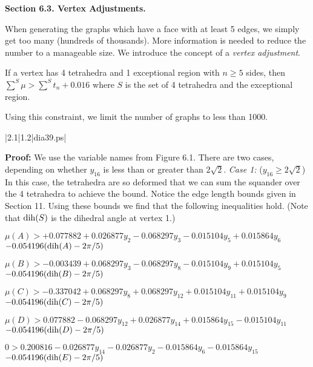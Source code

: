 \bigskip

{\bf Section 6.3. Vertex Adjustments.}

\bigskip


When generating the graphs which have a face with at least 5 edges, we simply get too many (hundreds of thousands).  More information is needed to reduce the number to a manageable size.  We introduce the concept of a {\it vertex adjustment}.  

 If a vertex has 4 tetrahedra and 1 exceptional region with $n\ge5$ sides, then $\sum^S\mu > \sum^S t_n+0.016$ where $S$ is the set of 4 tetrahedra and the exceptional region.
\endproclaim

Using this constraint, we limit the number of graphs to less than 1000.  

\gram|2.1|1.2|dia39.ps|  %


{\bf Proof:} We use the variable names from Figure 6.1. 
There are two cases, depending on whether $y_{16}$ is less than or greater than $2\sqrt 2$.
{\it Case 1:} ($y_{16}\ge2\sqrt2$) In this case, the tetrahedra are so deformed that we can sum the squander over the 4 tetrahedra to achieve the bound.  
Notice the edge length bounds given in Section 11.  Using these bounds we find that the following inequalities hold.  (Note that $\operatorname{dih}(S)$ is the dihedral angle at vertex 1.)



$\mu(A) > + 0.077882  + 0.026877 y_2 - 0.068297 y_3 - 0.015104 y_5 + 0.015864 y_6$  \newline $- 0.054196 (\operatorname{dih}(A)-2 \pi /5) $

$\mu(B) > - 0.003439  + 0.068297 y_3 - 0.068297 y_8 - 0.015104 y_9 + 0.015104 y_5$  \newline $- 0.054196 (\operatorname{dih}(B)-2 \pi /5) $

$\mu(C) > - 0.337042   + 0.068297 y_8 + 0.068297 y_{12} + 0.015104 y_{11} + 0.015104 y_9$  \newline $- 0.054196 (\operatorname{dih}(C)-2 \pi /5) $

$\mu(D) > 0.077882 - 0.068297 y_{12} + 0.026877 y_{14} + 0.015864 y_{15} - 0.015104 y_{11}$ \newline $ - 0.054196 (\operatorname{dih}(D)-2 \pi /5)$

$0 > 0.200816 - 0.026877 y_{14} - 0.026877 y_2 - 0.015864 y_6 - 0.015864 y_{15} $ \newline $ - 0.054196 (\operatorname{dih}(E)-2 \pi /5)$

